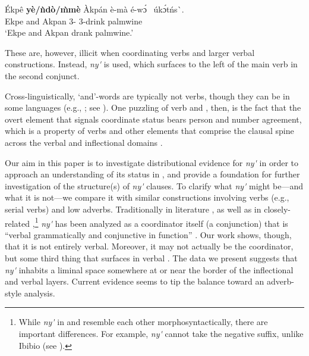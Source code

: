 \documentclass[output=paper,modfonts,nonflat,
colorlinks, citecolor=brown,
draftmode
]{langsci/langscibook}
\begin{document}
\ea\label{ex:duncan-et-al:2}
\gll \'{E}kpê \textbf{y\`{e}/ǹd\`{o}/\`{m}m\`{e}} \`{A}kpán \`{e}-mà é-\ng w\'ɔ\ng~ úk\'ɔtńs\`{\textturnv}\ng. \\
Ekpe and Akpan 3{\PL}-{\PST} 3{\PL}-drink palmwine \\
\glt ‘Ekpe and Akpan drank palmwine.’
\z

\noindent These are, however, illicit when coordinating verbs and larger verbal constructions. Instead, \textit{ny\'{\textturnv}\ng} is used, which surfaces to the left of the main verb in the second conjunct.

\ea\label{ex:duncan-et-al:3}
\z
\z

\noindent Cross-linguistically, `and'-words are typically not verbs, though they can be in some languages (e.g., ; see \citealt{brown2008verbs}). One puzzling  of  verb and , then, is the fact that the overt element that signals coordinate status bears person and number agreement, which is a property of verbs and other elements that comprise the clausal spine across the verbal and inflectional domains \citep{baker2010agreement}.

Our aim in this paper is to investigate distributional evidence for \textit{ny\'{\textturnv}\ng} in order to approach an understanding of its status in , and provide a foundation for further investigation of the structure(s) of \textit{ny\'{\textturnv}\ng} clauses. To clarify what \textit{ny\'{\textturnv}\ng} might be---and what it is not---we compare it with similar constructions involving verbs (e.g., serial verbs) and low adverbs. Traditionally in  literature \citep{essien1985negation,essien1990grammar}, as well as in closely-related  \citep{goldie1857principles,welmers1968efik,welmers1973african},\footnote{While \textit{ny\'{\textturnv}\ng} in  and  resemble each other morphosyntactically, there are important differences. For example,  \textit{ny\'{\textturnv}\ng} cannot take the negative suffix, unlike Ibibio (see ).} \textit{ny\'{\textturnv}\ng} has been analyzed as a coordinator itself (a conjunction) that is ``verbal grammatically and conjunctive in function'' \citep[148]{essien1990grammar}. Our work shows, though, that it is not entirely verbal. Moreover, it may not actually be the coordinator, but some third thing that surfaces in verbal . The data we present suggests that \textit{ny\'{\textturnv}\ng} inhabits a liminal space somewhere at or near the border of the inflectional and verbal layers. Current evidence seems to tip the balance toward an adverb-style analysis.
\end{document}
